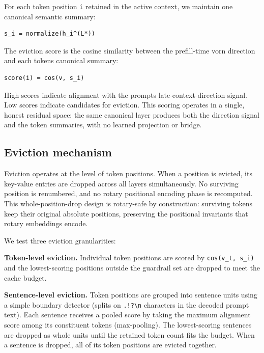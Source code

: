 \documentclass[10pt]{article}
\begin{document}
For each token position \texttt{i} retained in the active context, we
maintain one canonical semantic summary:

\begin{verbatim}
s_i = normalize(h_i^(L*))
\end{verbatim}

The eviction score is the cosine similarity between the prefill-time
vorn direction and each token\textquotesingle s canonical summary:

\begin{verbatim}
score(i) = cos(v, s_i)
\end{verbatim}

High scores indicate alignment with the prompt\textquotesingle s
late-context-direction signal. Low scores indicate candidates for
eviction. This scoring operates in a single, honest residual space: the
same canonical layer produces both the direction signal and the token
summaries, with no learned projection or bridge.

\subsection{Eviction mechanism}\label{32-eviction-mechanism}

Eviction operates at the level of token positions. When a position is
evicted, its key-value entries are dropped across all layers
simultaneously. No surviving position is renumbered, and no rotary
positional encoding phase is recomputed. This whole-position-drop design
is rotary-safe by construction: surviving tokens keep their original
absolute positions, preserving the positional invariants that rotary
embeddings encode.

We test three eviction granularities:

\textbf{Token-level eviction.} Individual token positions are scored by
\texttt{cos(v\_t,\ s\_i)} and the lowest-scoring positions outside the
guardrail set are dropped to meet the cache budget.

\textbf{Sentence-level eviction.} Token positions are grouped into
sentence units using a simple boundary detector (splits on
\texttt{.!?\textbackslash{}n} characters in the decoded prompt text).
Each sentence receives a pooled score by taking the maximum alignment
score among its constituent tokens (max-pooling). The lowest-scoring
sentences are dropped as whole units until the retained token count fits
the budget. When a sentence is dropped, all of its token positions are
evicted together.
\end{document}
